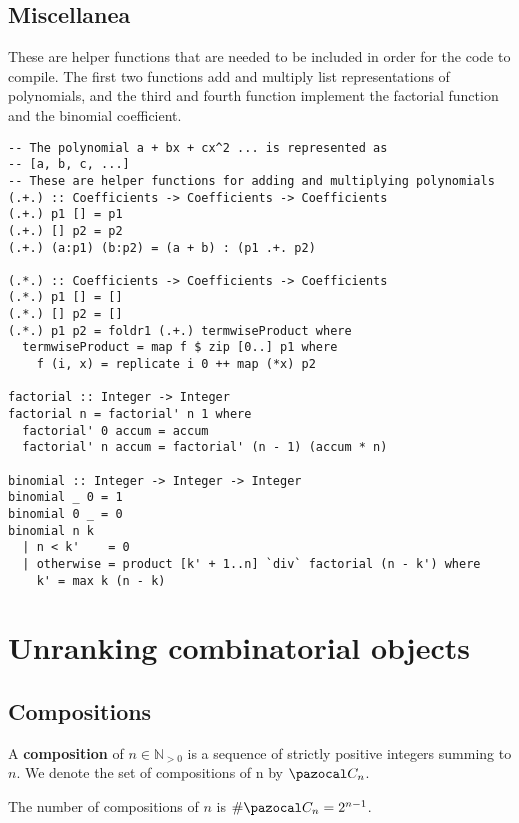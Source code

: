\subsection{Miscellanea}
These are helper functions that are needed to be included in order for the
code to compile. The first two functions add and multiply list representations
of polynomials, and the third and fourth function implement the factorial
function and the binomial coefficient.
\begin{singlespace}\begin{verbatim}
-- The polynomial a + bx + cx^2 ... is represented as
-- [a, b, c, ...]
-- These are helper functions for adding and multiplying polynomials
(.+.) :: Coefficients -> Coefficients -> Coefficients
(.+.) p1 [] = p1
(.+.) [] p2 = p2
(.+.) (a:p1) (b:p2) = (a + b) : (p1 .+. p2)

(.*.) :: Coefficients -> Coefficients -> Coefficients
(.*.) p1 [] = []
(.*.) [] p2 = []
(.*.) p1 p2 = foldr1 (.+.) termwiseProduct where
  termwiseProduct = map f $ zip [0..] p1 where
    f (i, x) = replicate i 0 ++ map (*x) p2

factorial :: Integer -> Integer
factorial n = factorial' n 1 where
  factorial' 0 accum = accum
  factorial' n accum = factorial' (n - 1) (accum * n)

binomial :: Integer -> Integer -> Integer
binomial _ 0 = 1
binomial 0 _ = 0
binomial n k
  | n < k'    = 0
  | otherwise = product [k' + 1..n] `div` factorial (n - k') where
    k' = max k (n - k)
\end{verbatim}\end{singlespace}

\section{Unranking combinatorial objects}
\label{apndx:unranking}
\subsection{Compositions}
\begin{definition}
  A \textbf{composition} of $n \in \mathbb{N}_{>0}$ is a sequence of
  strictly positive integers summing to $n$. We denote the set of compositions
  of n by $\pazocal C_n$.
\end{definition}

\begin{lemma} %
  The number of compositions of $n$ is $\#\pazocal C_n = 2^{n-1}$.
\end{lemma}

